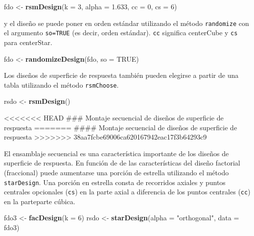 \documentclass[
]{book}
\newenvironment{Shaded}{\begin{snugshade}}{\end{snugshade}}
\newcommand{\AttributeTok}[1]{\textcolor[rgb]{0.13,0.29,0.53}{#1}}
\newcommand{\ConstantTok}[1]{\textcolor[rgb]{0.56,0.35,0.01}{#1}}
\newcommand{\DecValTok}[1]{\textcolor[rgb]{0.00,0.00,0.81}{#1}}
\newcommand{\FloatTok}[1]{\textcolor[rgb]{0.00,0.00,0.81}{#1}}
\newcommand{\FunctionTok}[1]{\textcolor[rgb]{0.13,0.29,0.53}{\textbf{#1}}}
\newcommand{\NormalTok}[1]{#1}
\newcommand{\OtherTok}[1]{\textcolor[rgb]{0.56,0.35,0.01}{#1}}
\newcommand{\StringTok}[1]{\textcolor[rgb]{0.31,0.60,0.02}{#1}}
\begin{document}
\begin{Shaded}
\begin{Highlighting}[]
\NormalTok{fdo }\OtherTok{\textless{}{-}} \FunctionTok{rsmDesign}\NormalTok{(}\AttributeTok{k =} \DecValTok{3}\NormalTok{, }\AttributeTok{alpha =} \FloatTok{1.633}\NormalTok{, }\AttributeTok{cc =} \DecValTok{0}\NormalTok{, }\AttributeTok{cs =} \DecValTok{6}\NormalTok{)}
\end{Highlighting}
\end{Shaded}

y el diseño se puede poner en orden estándar utilizando el método \texttt{randomize} con el argumento \texttt{so=TRUE} (es decir, orden estándar). \texttt{cc} significa centerCube y \texttt{cs} para centerStar.

\begin{Shaded}
\begin{Highlighting}[]
\NormalTok{fdo }\OtherTok{\textless{}{-}} \FunctionTok{randomizeDesign}\NormalTok{(fdo, }\AttributeTok{so =} \ConstantTok{TRUE}\NormalTok{)}
\end{Highlighting}
\end{Shaded}

Los diseños de superficie de respuesta también pueden elegirse a partir de una tabla utilizando el método \texttt{rsmChoose}.

\begin{Shaded}
\begin{Highlighting}[]
\NormalTok{rsdo }\OtherTok{\textless{}{-}} \FunctionTok{rsmDesign}\NormalTok{()}
\end{Highlighting}
\end{Shaded}

\textless\textless\textless\textless\textless\textless\textless{} HEAD
\#\#\# Montaje secuencial de diseños de superficie de respuesta
=======
\#\#\#\# Montaje secuencial de diseños de superficie de respuesta
\textgreater\textgreater\textgreater\textgreater\textgreater\textgreater\textgreater{} 38aa7fcbe69006ca620167942eac17f3b64293c9

El ensamblaje secuencial es una característica importante de los diseños de superficie de respuesta. En función de de las características del diseño factorial (fraccional) puede aumentarse una porción de estrella utilizando el método \texttt{starDesign}. Una porción en estrella consta de recorridos axiales
y puntos centrales opcionales (\texttt{cs}) en la parte axial a diferencia de los puntos centrales (\texttt{cc}) en la parteparte cúbica.

\begin{Shaded}
\begin{Highlighting}[]
\NormalTok{fdo3 }\OtherTok{\textless{}{-}} \FunctionTok{facDesign}\NormalTok{(}\AttributeTok{k =} \DecValTok{6}\NormalTok{)}
\NormalTok{rsdo }\OtherTok{\textless{}{-}} \FunctionTok{starDesign}\NormalTok{(}\AttributeTok{alpha =} \StringTok{"orthogonal"}\NormalTok{, }\AttributeTok{data =}\NormalTok{ fdo3)}
\end{Highlighting}
\end{Shaded}
\end{document}
